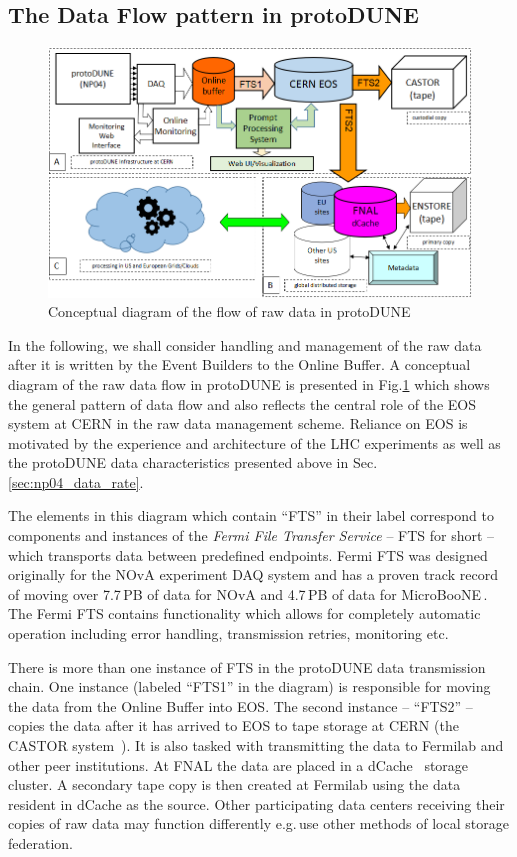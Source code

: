 \documentclass[a4paper]{jpconf}
\newcommand{\pd}{protoDUNE\xspace}
\begin{document}
\subsection{The Data Flow pattern in \pd}
\label{sec:flow}
\begin{figure}[tbh]
\centering\includegraphics[width=0.85\linewidth]{figures/protoDUNE_data_flow_2017_v2.png}
\caption{\label{fig:raw_concept}Conceptual diagram of the flow of raw data in \pd}
\end{figure}

\noindent In the following, we shall consider handling and management of the raw data after it is
written by the Event Builders to the Online Buffer.  A conceptual diagram of the raw data
flow in \pd is presented in Fig.\ref{fig:raw_concept} which shows the general pattern of data flow
and also reflects the central role of the EOS system at CERN \cite{eos} in the raw data management scheme.
Reliance on EOS is motivated by the experience and architecture of the LHC experiments
as well as the \pd data characteristics presented above in Sec.\,\ref{sec:np04_data_rate}.

The elements in this diagram which contain ``FTS'' in their label correspond to components and
instances of the \textit{Fermi File Transfer Service} -- FTS for short \cite{sam,fts} -- which transports
data between predefined endpoints. Fermi FTS was designed originally for the NOvA experiment
\cite{nova} DAQ system and has a proven track record of moving over 7.7\,PB of data for NOvA
and 4.7\,PB of data for MicroBooNE\,\cite{uboone}.
The Fermi FTS contains functionality which allows for completely automatic operation
including error handling, transmission retries, monitoring etc.

There is more than one instance of FTS in the \pd data transmission chain. One instance (labeled ``FTS1''
in the diagram) is responsible for moving the data from the Online Buffer into EOS. The second instance
-- ``FTS2'' --  copies the data after it has arrived to EOS to tape storage at CERN (the CASTOR
system~\cite{castor}). It is also tasked with transmitting the data to Fermilab  and other peer
institutions. At FNAL the data are placed in a dCache~\cite{dcache} storage cluster. A secondary
tape copy is then created at Fermilab using the data resident in dCache as the source.
Other participating data centers receiving their copies of raw data may function differently
e.g.\,use other methods of local storage federation.
\end{document}
